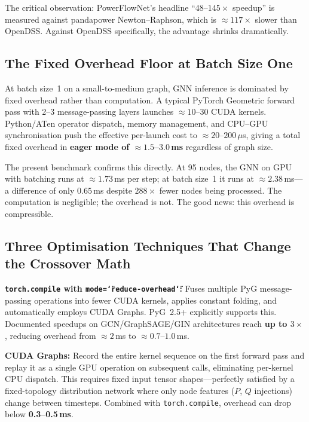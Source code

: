 \documentclass[11pt]{article}
\begin{document}
The critical observation: PowerFlowNet's headline ``$48$--$145\times$
speedup'' is measured against pandapower Newton--Raphson, which is
${\approx}117\times$ slower than OpenDSS.  Against OpenDSS specifically,
the advantage shrinks dramatically.

\subsection{The Fixed Overhead Floor at Batch Size One}

At batch size~1 on a small-to-medium graph, GNN inference is dominated by
fixed overhead rather than computation.  A typical PyTorch Geometric
forward pass with 2--3 message-passing layers launches ${\approx}10$--$30$
CUDA kernels.  Python/ATen operator dispatch, memory management, and
CPU--GPU synchronisation push the effective per-launch cost to
${\approx}20$--$200\,\mu$s, giving a total fixed overhead in
\textbf{eager mode of ${\approx}1.5$--$3.0$\,ms} regardless of graph
size.

The present benchmark confirms this directly.  At 95 nodes, the GNN on GPU
with batching runs at ${\approx}1.73$\,ms per step; at batch size~1 it
runs at ${\approx}2.38$\,ms---a difference of only $0.65$\,ms despite
$288\times$ fewer nodes being processed.  The computation is negligible;
the overhead is not.  The good news: this overhead is compressible.

\subsection{Three Optimisation Techniques That Change the Crossover Math}

\textbf{\texttt{torch.compile} with \texttt{mode=\char`\"reduce-overhead\char`\"}:}
Fuses multiple PyG message-passing operations into fewer CUDA kernels,
applies constant folding, and automatically employs CUDA Graphs.
PyG~2.5+ explicitly supports this.  Documented speedups on
GCN/GraphSAGE/GIN architectures reach \textbf{up to $3\times$}, reducing
overhead from ${\approx}2$\,ms to ${\approx}0.7$--$1.0$\,ms.

\textbf{CUDA Graphs:}
Record the entire kernel sequence on the first forward pass and replay it
as a single GPU operation on subsequent calls, eliminating per-kernel CPU
dispatch.  This requires fixed input tensor shapes---perfectly satisfied
by a fixed-topology distribution network where only node features ($P$,
$Q$ injections) change between timesteps.  Combined with
\texttt{torch.compile}, overhead can drop below \textbf{0.3--0.5\,ms}.
\end{document}
